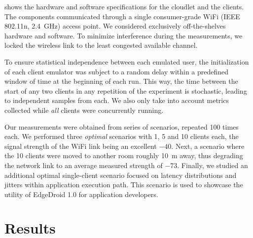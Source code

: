  shows the hardware and software specifications for the cloudlet and the clients.
The components communicated through a single consumer-grade WiFi (IEEE 802.11n, \SI{2.4}{\giga\hertz}) access point.
We considered exclusively off-the-shelves hardware and software.
To minimize interference during the measurements, we locked the wireless link to the least congested available channel.

To ensure statistical independence between each emulated user, the initialization of each client emulator was subject to a random delay within a predefined window of time at the beginning of each run.
This way, the time between the start of any two clients in any repetition of the experiment is stochastic, leading to independent samples from each.
We also only take into account metrics collected while \emph{all} clients were concurrently running.

Our measurements were obtained from series of scenarios, repeated 100 times each.
We performed three \emph{optimal} scenarios with 1, 5 and 10 clients each, the signal strength of the WiFi link being an excellent \SI{-40}{\dBm}.
Next, a scenario where the 10 clients were moved to another room roughly \SI{10}{\meter} away, thus degrading the network link to an average measured strength of \SI{-73}{\dBm}.
Finally, we studied an additional optimal single-client scenario focused on latency distributions and jitters within application execution path.
This scenario is used to showcase the utility of EdgeDroid 1.0 for application developers.

\section{Results}\label{sec:results}

